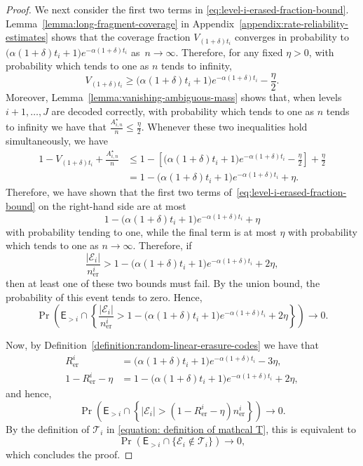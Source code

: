 \documentclass[journal,letterpaper,onecolumn,11pt]{IEEEtran}
\newcommand{\cE}{\mathcal{E}}
\newcommand{\cT}{\mathcal{T}}
\begin{document}
\begin{proof}
We next consider the first two terms in \eqref{eq:level-i-erased-fraction-bound}.
Lemma~\ref{lemma:long-fragment-coverage} in Appendix~\ref{appendix:rate-reliability-estimates} shows that the coverage fraction
\(V_{(1+\delta)t_i}\) converges in probability to
$
\bigl(\alpha(1+\delta)t_i+1\bigr)
e^{-\alpha(1+\delta)t_i}
$ as~$n\to\infty$.
Therefore, for any fixed \(\eta>0\), with probability which tends to one as $n$ tends to infinity,
\[
V_{(1+\delta)t_i}
\geq
\bigl(\alpha(1+\delta)t_i+1\bigr)
e^{-\alpha(1+\delta)t_i}
-\frac{\eta}{2}.
\]
Moreover, Lemma~\ref{lemma:vanishing-ambiguous-mass} shows that, when
levels \(i+1,\ldots,J\) are decoded correctly, with probability which tends to one as $n$ tends to infinity we have that
$
\frac{A_{i,n}^{\star}}{n}
\leq
\frac{\eta}{2}.
$
Whenever these two inequalities hold simultaneously, we have
\[
\begin{aligned}
1-V_{(1+\delta)t_i}
+\frac{A_{i,n}^{\star}}{n}
&\leq
1-
\left[
\bigl(\alpha(1+\delta)t_i+1\bigr)
e^{-\alpha(1+\delta)t_i}
-\frac{\eta}{2}
\right]
+\frac{\eta}{2}\\
&=
1-
\bigl(\alpha(1+\delta)t_i+1\bigr)
e^{-\alpha(1+\delta)t_i}
+\eta.
\end{aligned}
\]
Therefore, we have shown that the first two terms of~\eqref{eq:level-i-erased-fraction-bound} on the right-hand side are at most
\[
1-
\bigl(\alpha(1+\delta)t_i+1\bigr)
e^{-\alpha(1+\delta)t_i}
+\eta
\]
with probability tending to one, while the final term is at most
\(\eta\) with probability which tends to one as $n\to\infty$.  Therefore, if
\[
\frac{|\cE_i|}{n_{\mathrm{er}}^i}
>
1-
\bigl(\alpha(1+\delta)t_i+1\bigr)
e^{-\alpha(1+\delta)t_i}
+2\eta,
\]
then at least one of these two bounds must fail.  By the union bound, the
probability of this event tends to zero.  Hence,
\[
\Pr\left(
\mathsf E_{>i}
\cap
\left\{
\frac{|\cE_i|}{n_{\mathrm{er}}^i}
>
1-
\bigl(\alpha(1+\delta)t_i+1\bigr)
e^{-\alpha(1+\delta)t_i}
+2\eta
\right\}
\right)
\longrightarrow0.
\]

Now, by Definition~\ref{definition:random-linear-erasure-codes} we have that
\begin{align*}
    R_{\mathrm{er}}^i&=
\bigl(\alpha(1+\delta)t_i+1\bigr)e^{-\alpha(1+\delta)t_i}-3\eta,\\
1-R_{\mathrm{er}}^i-\eta
&=
1-
\bigl(\alpha(1+\delta)t_i+1\bigr)
e^{-\alpha(1+\delta)t_i}
+
2\eta,
\end{align*}
and hence,
\[
\Pr\left(
\mathsf E_{>i}
\cap
\left\{
|\cE_i|>
(1-R_{\mathrm{er}}^i-\eta)n_{\mathrm{er}}^i
\right\}
\right)
\longrightarrow0.
\]
By the definition of \(\cT_i\) in
\eqref{equation: definition of mathcal T}, this is equivalent to
\[
\Pr\left(
\mathsf E_{>i}
\cap
\{\cE_i\notin\cT_i\}
\right)
\longrightarrow0,
\]
which concludes the proof.
\end{proof}
\end{document}
